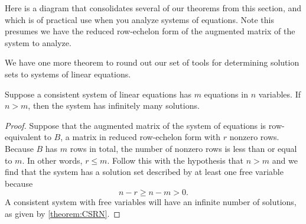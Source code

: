 \documentclass{ximera}
\begin{document}
Here is a diagram that consolidates several of our theorems from this section, and which is of practical use when you analyze systems of equations.  Note this presumes we have the reduced row-echelon form of the augmented matrix of the system to analyze.
\begin{image}
\end{image}

We have one more theorem to round out our set of tools for determining solution sets to systems of linear equations.

\begin{theorem}
\label{theorem:CMVEI}

Suppose a consistent system of linear equations has $m$ equations in $n$ variables.  If $n>m$, then the system has infinitely many solutions.

\begin{proof}
Suppose that the augmented matrix of the system of equations is row-equivalent to $B$, a matrix in reduced row-echelon form with $r$ nonzero rows.
Because $B$ has $m$ rows in total, the number of nonzero rows is less than or equal to $m$.  In other words, $r\leq m$.
Follow this with the hypothesis that $n>m$ and we find that the system has a solution set described by at least one free variable because
\[
n-r\geq n-m>0.
\]
A consistent system with free variables will have an infinite number of solutions, as given by \ref{theorem:CSRN}.
\end{proof}
\end{theorem}
\end{document}
